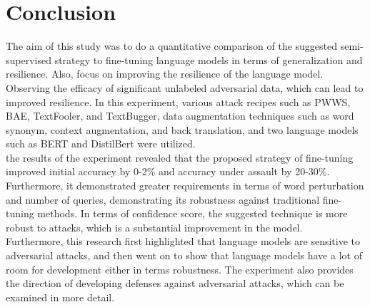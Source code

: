 \documentclass[%
	BCOR=8mm, %
	DIV=12,
	toc=bibliography, %
	toc=listof, %
	oneside, %
	egregdoesnotlikesansseriftitles, %
	]{scrbook}
\begin{document}
\section{Conclusion}
\label{section:conclusion}
The aim of this study was to do a quantitative comparison of the suggested semi-supervised strategy to fine-tuning language models in terms of generalization and resilience. Also, focus on improving the resilience of the language model. Observing the efficacy of significant unlabeled adversarial data, which can lead to improved resilience. In this experiment, various attack recipes such as PWWS, BAE, TextFooler, and TextBugger, data augmentation techniques such as word synonym, context augmentation, and back translation, and two language models such as BERT and DistilBert were utilized.\\
the results of the experiment revealed that the proposed strategy of fine-tuning improved initial accuracy by 0-2\% and accuracy under assault by 20-30\%. Furthermore, it demonstrated greater requirements in terms of word perturbation and number of queries, demonstrating its robustness against traditional fine-tuning methods. In terms of confidence score, the suggested technique is more robust to attacks, which is a substantial improvement in the model.\\
Furthermore, this research first highlighted that language models are sensitive to adversarial attacks, and then went on to show that language models have a lot of room for development either in terms robustness. The experiment also provides the direction of developing defenses against adversarial attacks, which can be examined in more detail.





%
%
\printbibliography
\end{document}
